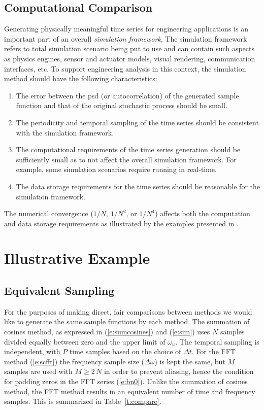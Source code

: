 \documentclass[journal]{IEEEtran}
\begin{document}
\subsection{Computational Comparison}

Generating physically meaningful time series for engineering applications is an important part of an overall \emph{simulation framework},  The simulation framework refers to total simulation scenario being put to use and can contain such aspects as physics engines, sensor and actuator models, visual rendering, communication interfaces, etc.  To support engineering analysis in this context, the simulation method should have the following characteristics:
\begin{enumerate}
\item The error between the \ac{psd} (or autocorrelation) of the generated sample function and that of the original stochastic process should be small.
\item The periodicity and temporal sampling of the time series should be consistent with the simulation framework.
\item The computational requirements of the time series generation should be sufficiently small as to not affect the overall simulation framework.  For example, some simulation scenarios require running in real-time.
\item The data storage requirements for the time series should be reasonable for the simulation framework.
\end{enumerate}

The numerical convergence ($1/N$, $1/N^2$, or $1/N^4$) affects both the computation and data storage requirements as illustrated by the examples presented in \cite{hu97simulation}.

\section{Illustrative Example}

\subsection{Equivalent Sampling}

For the purposes of making direct, fair comparisons between methods we would like to generate the same sample functions by each method.  The summation of cosines method, as expressed in (\ref{e:sumcosines}) and (\ref{e:sim}) uses $N$ samples divided equally between zero and the upper limit of $\omega_u$.  The temporal sampling is independent, with $P$ time samples based on the choice of $\Delta t$.  For the FFT method (\ref{e:scfft}) the frequency sample size ($\Delta \omega$) is kept the same, but $M$ samples are used with $M\geq 2 \, N$ in order to prevent aliasing, hence the condition for padding zeros in the FFT series (\ref{e:bn0}).  Unlike the summation of cosines method, the FFT method results in an equivalent number of time and frequency samples.  This is summarized in Table~\ref{t:compare}.
\end{document}
